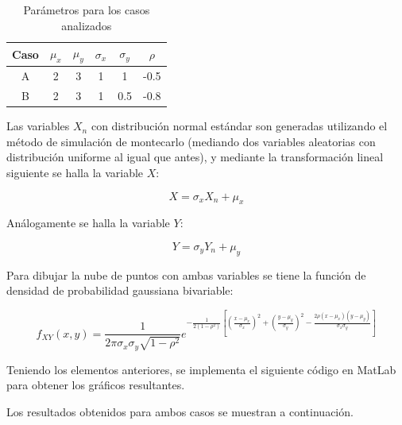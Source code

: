 \begin{table}[ht]
\begin{centering}
\begin{tabular}{|c||c|c|c|c|c|}
\hline 
Caso & $\mu_x$ & $\mu_y$ & $\sigma_x$ & $\sigma_y$ & $\rho$\\
\hline 
\hline 
A & 2 & 3 & 1 & 1 & -0.5\tabularnewline
\hline 
B & 2 & 3 & 1 & 0.5 & -0.8\tabularnewline
\hline 
\end{tabular}
\par\end{centering}
\caption{Par\'ametros para los casos analizados}

\end{table}

Las variables $X_n$ con distribuci\'on normal est\'andar son generadas utilizando el m\'etodo de simulaci\'on de montecarlo (mediando dos variables aleatorias con distribuci\'on uniforme al igual que antes), y mediante la transformaci\'on lineal siguiente se halla la variable $X$:

\[
X = \sigma_x X_n + \mu_x
\]

An\'alogamente se halla la variable $Y$:

\[
Y = \sigma_y Y_n + \mu_y
\]

Para dibujar la nube de puntos con ambas variables se tiene la funci\'on de densidad de probabilidad gaussiana bivariable:

\[
f_{XY}(x,y) = \frac{1}{2 \pi \sigma_x \sigma_y \sqrt{1-\rho^2}} e^{- \frac{1}{2 \left(1-\rho^2\right)} \left[ \left( \frac{x-\mu_x}{\sigma_x} \right)^2 + \left( \frac{y-\mu_y}{\sigma_y} \right)^2 - \frac{2 \rho (x-\mu_x) (y-\mu_y)}{\sigma_x \sigma_y} \right]}
\]

Teniendo los elementos anteriores, se implementa el siguiente c\'odigo en MatLab para obtener los gr\'aficos resultantes.



Los resultados obtenidos para ambos casos se muestran a continuaci\'on.

